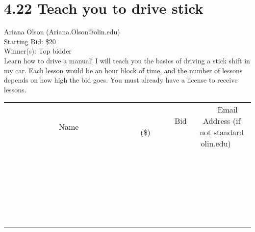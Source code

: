 \documentclass[11pt]{article}
\begin{document}
\section*{4.22 Teach you to drive stick}
Ariana Olson (Ariana.Olson@olin.edu) \\
Starting Bid: \$20 \\
Winner(s): 
Top bidder \\
Learn how to drive a manual! I will teach you the basics of driving a stick shift in my car. Each lesson would be an hour block of time, and the number of lessons depends on how high the bid goes. You must already have a license to receive lessons. \\[6ex]
\begin{tabular}{c c c}
~~~~~~~~~~~~~Name~~~~~~~~~~~~~ & ~~~~~~~~~Bid (\$)~~~~~~~~~ & ~~~Email Address (if not standard olin.edu)~~~ \\
 & & \\
\hline
 & & \\
\hline
 & & \\
\hline
 & & \\
\hline
 & & \\
\hline
 & & \\
\hline
 & & \\
\hline
 & & \\
\hline
 & & \\
\hline
 & & \\
\hline
 & & \\
\hline
 & & \\
\hline
 & & \\
\hline
 & & \\
\hline
 & & \\
\hline
 & & \\
\hline
 & & \\
\hline
 & & \\
\hline
 & & \\
\hline
 & & \\
\hline
 & & \\
\hline
 & & \\
\hline
 & & \\
\hline
 & & \\
\hline
 & & \\
\hline
 & & \\
\hline
\end{tabular}
\clearpage
\end{document}
